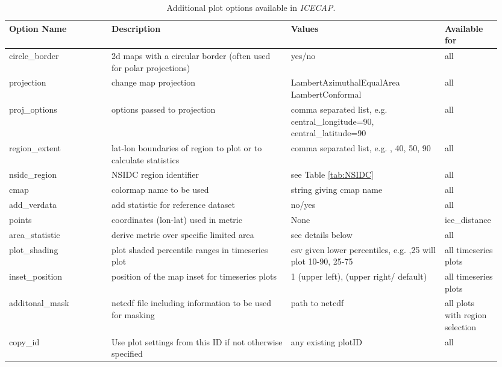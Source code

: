 \documentclass[DIV=10, parskip=full]{scrreprt}
\newcommand{\ice}{\textit{ICECAP}\xspace}
\begin{document}
\begin{landscape}
	\thispagestyle{empty}
	\begin{table}
	\begin{longtable}{p{0.2\linewidth}p{0.35\linewidth}p{0.3\linewidth}p{0.1\linewidth}}
		\toprule
		\textbf{Option Name} & \textbf{Description}      & \textbf{Values}  & \textbf{Available for}  \\ \midrule
		circle\_border       & 2d maps with a circular border (often used for polar projections) & yes/no    & all      \\
		projection           & change map projection  & LambertAzimuthalEqualArea LambertConformal   &   all \\
		proj\_options        & options passed to projection  & comma separated list, e.g. \newline central\_longitude=90, \newline central\_latitude=90 &  all \\
		region\_extent 	& lat-lon boundaries of region to plot	 or to calculate statistics & comma separated list, e.g. \newline -40, 40, 50, 90	& all  \\
		nsidc\_region & NSIDC region identifier   & see Table \ref{tab:NSIDC} & all \\
		cmap	& colormap name to be used 	& string giving cmap name & all \\
		add\_verdata & add statistic for reference dataset & no/yes & all  \\
		points & coordinates (lon-lat) used in metric & None & ice\_distance \\
		area\_statistic & derive metric over specific limited area & see details below & all\\
		plot\_shading & plot shaded percentile ranges in timeseries plot &  csv given lower percentiles, e.g. \newline 10,25 will plot 10-90, 25-75 & all timeseries plots \\
		inset\_position & position of the map inset for timeseries plots & 1 (upper left), \newline 2 (upper right/ default) & all timeseries plots \\
		additonal\_mask & netcdf file including information to be used for masking & path to netcdf & all plots with region selection \\
		copy\_id & Use plot settings from this ID if not otherwise specified & any existing plotID & all \\
		\bottomrule
	\end{longtable}
	\caption{Additional plot options available in \ice.} 
	\label{tab:add_options}
	\end{table}
\end{landscape} 
\restoregeometry
\end{document}
